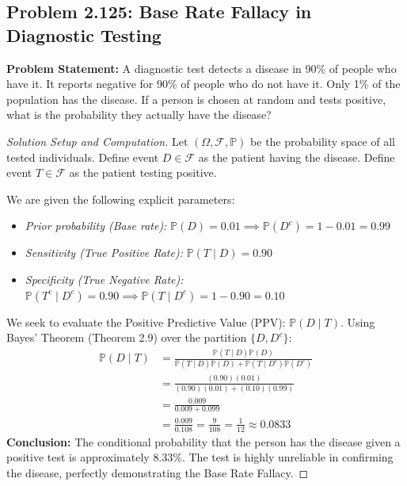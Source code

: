 \documentclass[12pt]{article}
\begin{document}
\subsection{Problem 2.125: Base Rate Fallacy in Diagnostic Testing}
\textbf{Problem Statement:} A diagnostic test detects a disease in 90\% of people who have it. It reports negative for 90\% of people who do not have it. Only 1\% of the population has the disease. If a person is chosen at random and tests positive, what is the probability they actually have the disease?

\begin{proof}[Solution Setup and Computation]
Let $(\Omega, \mathcal{F}, \mathbb{P})$ be the probability space of all tested individuals.
Define event $D \in \mathcal{F}$ as the patient having the disease.
Define event $T \in \mathcal{F}$ as the patient testing positive.

We are given the following explicit parameters:
\begin{itemize}
    \item \textit{Prior probability (Base rate):} $\mathbb{P}(D) = 0.01 \implies \mathbb{P}(D^c) = 1 - 0.01 = 0.99$
    \item \textit{Sensitivity (True Positive Rate):} $\mathbb{P}(T \mid D) = 0.90$
    \item \textit{Specificity (True Negative Rate):} $\mathbb{P}(T^c \mid D^c) = 0.90 \implies \mathbb{P}(T \mid D^c) = 1 - 0.90 = 0.10$
\end{itemize}

We seek to evaluate the Positive Predictive Value (PPV): $\mathbb{P}(D \mid T)$.
Using Bayes' Theorem (Theorem 2.9) over the partition $\{D, D^c\}$:
\begin{align*}
    \mathbb{P}(D \mid T) &= \frac{\mathbb{P}(T \mid D)\mathbb{P}(D)}{\mathbb{P}(T \mid D)\mathbb{P}(D) + \mathbb{P}(T \mid D^c)\mathbb{P}(D^c)} \\
    &= \frac{(0.90)(0.01)}{(0.90)(0.01) + (0.10)(0.99)} \\
    &= \frac{0.009}{0.009 + 0.099} \\
    &= \frac{0.009}{0.108} = \frac{9}{108} = \frac{1}{12} \approx 0.0833
\end{align*}
\textbf{Conclusion:} The conditional probability that the person has the disease given a positive test is approximately $8.33\%$. The test is highly unreliable in confirming the disease, perfectly demonstrating the Base Rate Fallacy.
\end{proof}
\end{document}
